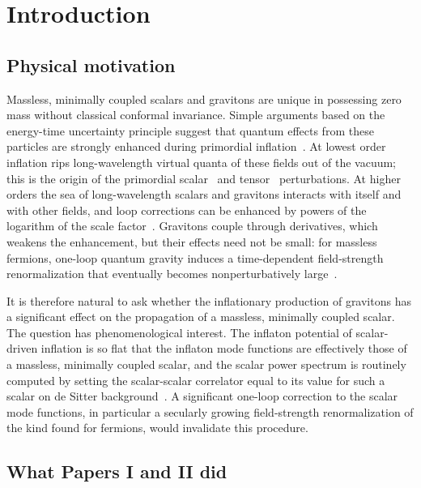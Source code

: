 \documentclass[aps,prd,onecolumn,10pt,nofootinbib,floatfix]{revtex4-2}
\begin{document}
\section{Introduction}
\label{sec:s0s1s7s8:intro}

\subsection{Physical motivation}

Massless, minimally coupled scalars and gravitons are unique in possessing zero mass without classical conformal invariance.
Simple arguments based on the energy-time uncertainty principle suggest that quantum effects from these particles are strongly
enhanced during primordial inflation~\cite{ref:Woodard2004}. At lowest order inflation rips long-wavelength virtual quanta of these
fields out of the vacuum; this is the origin of the primordial scalar~\cite{ref:Mukhanov1981} and tensor~\cite{ref:Starobinsky1979}
perturbations. At higher orders the sea of long-wavelength scalars and gravitons interacts with itself and with other fields, and loop
corrections can be enhanced by powers of the logarithm of the scale factor~\cite{ref:Weinberg2005}. Gravitons couple through
derivatives, which weakens the enhancement, but their effects need not be small: for massless fermions, one-loop quantum gravity
induces a time-dependent field-strength renormalization that eventually becomes nonperturbatively large~\cite{ref:Miao2006}.

It is therefore natural to ask whether the inflationary production of gravitons has a significant effect on the propagation of a
massless, minimally coupled scalar. The question has phenomenological interest. The inflaton potential of scalar-driven inflation is so
flat that the inflaton mode functions are effectively those of a massless, minimally coupled scalar, and the scalar power spectrum is
routinely computed by setting the scalar-scalar correlator equal to its value for such a scalar on de Sitter
background~\cite{ref:Mukhanov1992,ref:Liddle1993}. A significant one-loop correction to the scalar mode functions, in particular a
secularly growing field-strength renormalization of the kind found for fermions, would invalidate this procedure.

\subsection{What Papers I and II did}
\end{document}
